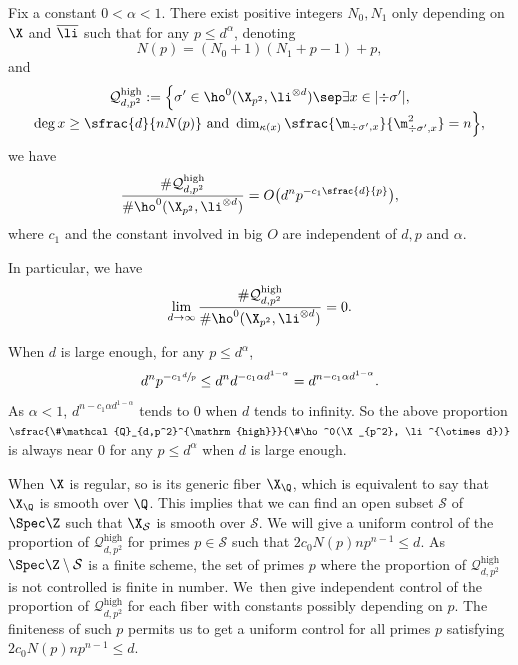 \label{step3}

\begin{prop}\label{high}
Fix a constant $0<\alpha<1$.
There exist positive integers $N_0,N_1$ only depending on $\X$ and $\overline{\li}$ such that for any $p\leq d^{\alpha} $, denoting
\[
N(p)= (N_0+1)(N_1+p-1)+p,
\]
and
\begin{multline*}
\mathcal{Q}^{\mathrm{high}}_{d,p^2}:=\Bigl\{ \sigma'\in \ho^0(\X_{p^2}, \li^{\otimes d})\sep \exists x\in |{\div\sigma'}|,\\[-3pt]
\deg x\geq \sfrac{d}{nN(p)} \text{ and } \dim_{\kappa(x)}\sfrac{\m_{\div \sigma',x}}{\m^2_{\div \sigma', x}}=n \Bigr\},
\end{multline*}
we have
\[
\frac{\#\mathcal{Q}_{d,p^2}^{\mathrm{high}}}{\#\ho^0(\X_{p^2}, \li^{\otimes d})}=O\bigl(d^{n}p^{-c_1\sfrac{d}{p}} \bigr),
\]
where $c_1$ and the constant involved in big $O$ are independent of $d,p$ and $\alpha$.

In particular, we have
\[
\lim_{d\to \infty}\frac{\#\mathcal{Q}_{d,p^2}^{\mathrm{high}}}{\#\ho^0(\X_{p^2}, \li^{\otimes d})}=0.
\]
\end{prop}
\begin{rmq}
When $d$ is large enough, for any $p\leq d^{\alpha}$,
\[
d^{n}p^{-c_1\sfrac{d}{p}}\leq d^{n}d^{-c_1\alpha d^{1-\alpha}}=d^{n-c_1\alpha d^{1-\alpha}}.
\]
As $\alpha<1$, $d^{n-c_1\alpha d^{1-\alpha}}$ tends to $0$ when $d$ tends to infinity. So the above proportion $\sfrac{\#\mathcal{Q}_{d,p^2}^{\mathrm{high}}}{\#\ho^0(\X_{p^2}, \li^{\otimes d})}$ is always near $0$ for any $p\leq d^{\alpha}$ when $d$ is large enough.
\end{rmq}

When $\X$ is regular, so is its generic fiber $\X_{\Q}$, which is equivalent to say that $\X_{\Q}$ is smooth over $\Q$. This implies that we can find an open subset $\mathcal{S}$ of $\Spec \Z$ such that $\X_{\mathcal{S}}$ is smooth over $\mathcal{S}$. We will give a uniform control of the proportion of $\mathcal{Q}_{d,p^2}^{\mathrm{high}}$ for primes $p\in \mathcal{S}$ such that $2c_0N(p)np^{n-1}\leq d$. As $\Spec \Z\setminus\mathcal{S}$ is a finite scheme, the set of primes $p$ where the proportion of $\mathcal{Q}_{d,p^2}^{\mathrm{high}}$ is not controlled is finite in number. We~then give independent control of the proportion of $\mathcal{Q}_{d,p^2}^{\mathrm{high}}$ for each fiber with constants possibly depending on $p$. The finiteness of such $p$ permits us to get a uniform control for all primes $p$ satisfying $2c_0N(p)np^{n-1}\leq d$.

